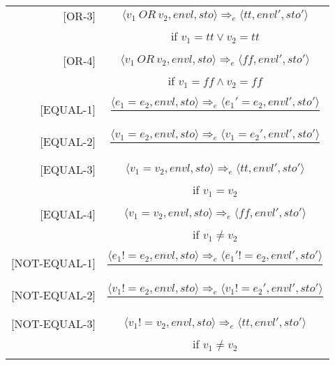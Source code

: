 \begin{longtable}[c] { r c }
  [OR-3] & \( 
    \langle v_1 \ OR \ v_2, envl, sto \rangle \Rightarrow_e \langle tt, envl', sto' \rangle \)
  \\
  & if \( v_1 = tt \lor v_2 = tt\) \\
  & \\

  [OR-4] & \( 
    \langle v_1 \ OR \ v_2, envl, sto \rangle \Rightarrow_e \langle ff, envl', sto' \rangle \)
  \\
  & if \( v_1 = ff \land  v_2 = ff \) \\
  & \\

  [EQUAL-1] & \( 
    \dfrac { \langle e_1 = e_2, envl, sto \rangle \Rightarrow_e \langle e_1' = e_2, envl', sto' \rangle }
      { } \)
  \\
  & \\

  [EQUAL-2] & \( 
    \dfrac { \langle v_1 = e_2, envl, sto \rangle \Rightarrow_e \langle v_1 = e_2', envl', sto' \rangle }
      { } \)
  \\
  & \\

  [EQUAL-3] & \( 
    \langle v_1 = v_2, envl, sto \rangle \Rightarrow_e \langle tt, envl', sto' \rangle \)
  \\
  & if \( v_1 = v_2 \) \\
  & \\

  [EQUAL-4] & \( 
    \langle v_1 = v_2, envl, sto \rangle \Rightarrow_e \langle ff, envl', sto' \rangle \)
  \\
  & if \( v_1 \neq v_2 \) \\
  & \\

  [NOT-EQUAL-1] & \( 
    \dfrac { \langle e_1 != e_2, envl, sto \rangle \Rightarrow_e \langle e_1' != e_2, envl', sto' \rangle }
      { } \)
  \\
  & \\

  [NOT-EQUAL-2] & \( 
    \dfrac { \langle v_1 != e_2, envl, sto \rangle \Rightarrow_e \langle v_1 != e_2', envl', sto' \rangle }
      { } \)
  \\
  & \\

  [NOT-EQUAL-3] & \( 
    \langle v_1 != v_2, envl, sto \rangle \Rightarrow_e \langle tt, envl', sto' \rangle \)
  \\
  & if \( v_1 \neq v_2 \) \\
  & \\


\end{longtable}
